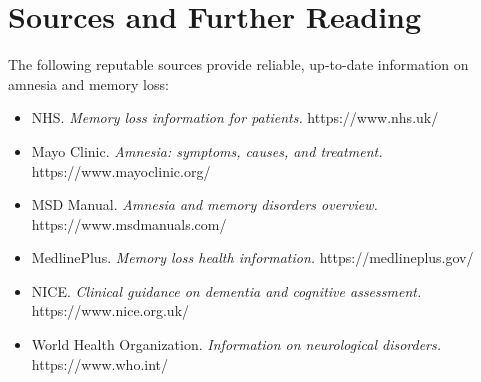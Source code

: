 \section*{Sources and Further Reading}
The following reputable sources provide reliable, up-to-date information on amnesia and memory loss:

\begin{itemize}
    \item NHS. \textit{Memory loss information for patients.} https://www.nhs.uk/
    \item Mayo Clinic. \textit{Amnesia: symptoms, causes, and treatment.} https://www.mayoclinic.org/
    \item MSD Manual. \textit{Amnesia and memory disorders overview.} https://www.msdmanuals.com/
    \item MedlinePlus. \textit{Memory loss health information.} https://medlineplus.gov/
    \item NICE. \textit{Clinical guidance on dementia and cognitive assessment.} https://www.nice.org.uk/
    \item World Health Organization. \textit{Information on neurological disorders.} https://www.who.int/
\end{itemize}
